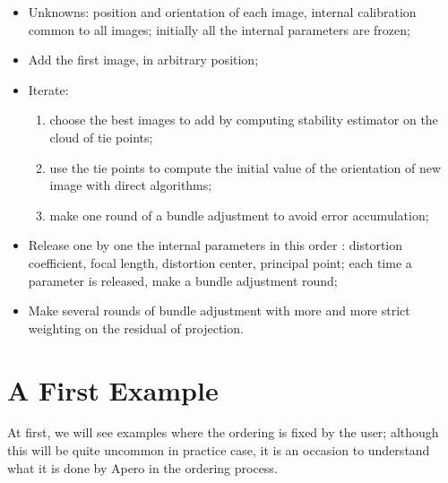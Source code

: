 \begin{itemize}

    \item Unknowns: position and orientation of each image, internal calibration common to all images;
            initially all the internal parameters are frozen;

     \item        Add the first image, in arbitrary position;

      \item        Iterate: %
\begin{enumerate}
        \item choose the best images to add  by computing stability estimator on the cloud of tie points;
        \item use the tie points to compute the initial value of the orientation of new image with direct algorithms;
        \item make one round of a bundle adjustment to avoid error accumulation;
\end{enumerate}

       \item      Release one by one the internal parameters in this order : distortion coefficient, focal length,
            distortion center, principal point; each time a parameter is released, make a bundle adjustment round;


        \item      Make several rounds of bundle adjustment with more and more strict weighting on the residual of projection.
\end{itemize}



\section{A First Example}

At first, we will see examples where the ordering is
fixed by the user; although this will be quite uncommon in practice
case, it is an occasion to understand what it is done by Apero in
the ordering process.

